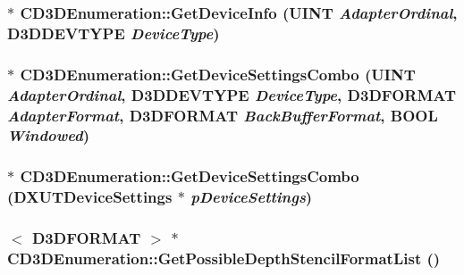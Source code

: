 \label{class_c_d3_d_enumeration_a4ba124e20eacf7ae3e4ec992b0cca7b5}
\hypertarget{class_c_d3_d_enumeration_a6324bb0b0ea8e89495d4d9372983d162}{
\subsubsection[{GetDeviceInfo}]{ $\ast$ CD3DEnumeration::GetDeviceInfo (UINT {\em AdapterOrdinal}, \/  D3DDEVTYPE {\em DeviceType})}}
\label{class_c_d3_d_enumeration_a6324bb0b0ea8e89495d4d9372983d162}
\hypertarget{class_c_d3_d_enumeration_ae344a1fde9c6b0f784edd8a2c1828416}{
\subsubsection[{GetDeviceSettingsCombo}]{ $\ast$ CD3DEnumeration::GetDeviceSettingsCombo (UINT {\em AdapterOrdinal}, \/  D3DDEVTYPE {\em DeviceType}, \/  D3DFORMAT {\em AdapterFormat}, \/  D3DFORMAT {\em BackBufferFormat}, \/  BOOL {\em Windowed})}}
\label{class_c_d3_d_enumeration_ae344a1fde9c6b0f784edd8a2c1828416}
\hypertarget{class_c_d3_d_enumeration_ac005a832569d4b0365abd49b3ff5b8cf}{
\subsubsection[{GetDeviceSettingsCombo}]{$\ast$ CD3DEnumeration::GetDeviceSettingsCombo ({\bf DXUTDeviceSettings} $\ast$ {\em pDeviceSettings})}}
\label{class_c_d3_d_enumeration_ac005a832569d4b0365abd49b3ff5b8cf}
\hypertarget{class_c_d3_d_enumeration_ae09bcb3c67d88efad3a9b01d2608911f}{
\subsubsection[{GetPossibleDepthStencilFormatList}]{$<$ D3DFORMAT $>$ $\ast$ CD3DEnumeration::GetPossibleDepthStencilFormatList ()}}
